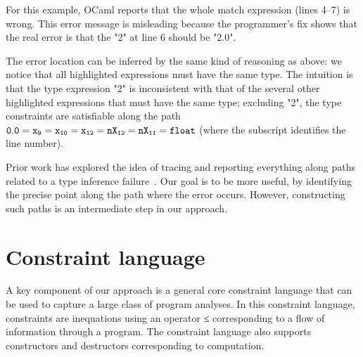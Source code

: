For this example, OCaml reports that the whole match expression (lines
4--7) is wrong. This error message is misleading because the programmer's
fix shows that the real error is that the "2" at line 6 should be "2.0".

The error location can be inferred by the same kind of reasoning as
above: we notice that all highlighted
expressions must have the same type. The intuition is that
the type expression "2" is inconsistent with that of the several
other highlighted expressions that must have the same type;
excluding "2", the type constraints are satisfiable along the path
$\mathtt{0.0=x_{9}=x_{10}=x_{12}=nX_{12}=nX_{11}=float}$ (where the
subscript identifies the line number).

Prior work has explored the idea of tracing and reporting everything
along paths related to a type inference
failure~\cite{wand-errorfinding,choppella95, haack:slicing,
tip:slicing}. Our goal is to be more useful, by identifying the
precise point along the path where the error occurs. However,
constructing such paths is an intermediate step in our approach.

% 
% 
% 
% 
\section{Constraint language}
\label{sec:language}

A key component of our approach is a general core constraint language
that can be used to capture a large class of program analyses.
In this constraint language, constraints are inequations using an
operator ≤ corresponding
to a flow of information through a program. The constraint language
also supports constructors and destructors corresponding to
computation.

